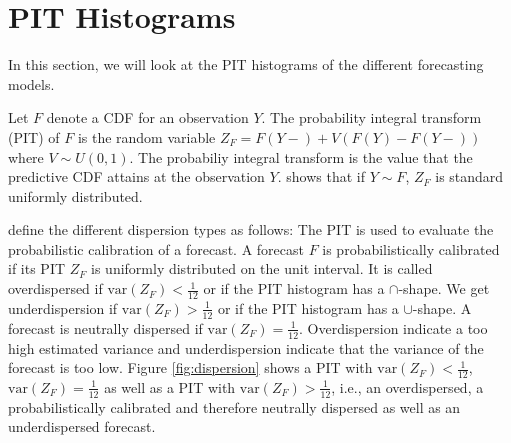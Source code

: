 \section{PIT Histograms}

In this section, we will look at the PIT histograms of the different forecasting models. 

Let \(F\) denote a CDF for an observation \(Y\). The probability integral 
transform (PIT) of \(F\) is the random variable \(Z_F = F(Y-) + V(F(Y) - F(Y-))\) 
where \(V \sim U(0,1)\). 
The probabiliy integral transform is the value that the predictive CDF 
attains at the observation \(Y\). \Textcite{Rueschendorf2009} shows that if \(Y \sim F\), \(Z_F\) is standard uniformly distributed.

\Textcite{Gneiting2014} define the different dispersion types as follows:
The PIT is used to evaluate the probabilistic calibration of a forecast. 
A forecast \(F\) is probabilistically calibrated if its PIT \(Z_F\) 
is uniformly distributed on the unit interval. 
It is called overdispersed if \(\mathrm{var}(Z_F) < \frac{1}{12}\) or if 
the PIT histogram has a \(\cap\)-shape. We get underdispersion if 
\(\mathrm{var}(Z_F) > \frac{1}{12}\) or if the PIT histogram has a \(\cup\)-shape. 
A forecast is neutrally dispersed if \(\mathrm{var}(Z_F) = \frac{1}{12}\).
Overdispersion indicate a too high estimated variance and underdispersion indicate 
that the variance of the forecast is too low. 
Figure \ref{fig:dispersion} shows a PIT with \(\mathrm{var}(Z_F) < \frac{1}{12}\), 
\(\mathrm{var}(Z_F) = \frac{1}{12}\) as well as a PIT with \(\mathrm{var}(Z_F) > \frac{1}{12}\), 
i.e., an overdispersed, a probabilistically calibrated and therefore neutrally dispersed as well as an underdispersed forecast.


